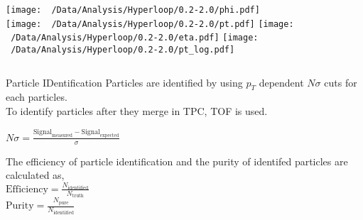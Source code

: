 \documentclass{beamer}
\begin{document}
\begin{frame}
	\begin{columns}
		\centering
		\texttt{[image: ~/Data/Analysis/Hyperloop/0.2-2.0/phi.pdf]}\\
		\texttt{[image: ~/Data/Analysis/Hyperloop/0.2-2.0/pt.pdf]}
		\centering
		\texttt{[image: ~/Data/Analysis/Hyperloop/0.2-2.0/eta.pdf]}
		\texttt{[image: ~/Data/Analysis/Hyperloop/0.2-2.0/pt\_log.pdf]}
	\end{columns}
\end{frame}
\begin{frame}{Particle IDentification}
	Particles are identified by using $p_T$ dependent $N\sigma$ cuts for each particles.\\
	To identify particles after they merge in TPC, TOF is used.\\
	\begin{definition}\centering
		$N\sigma=\frac{\mathrm{Signal}_\mathrm{measured}-\mathrm{Signal}_\mathrm{expected}}{\sigma}$\\
	\end{definition}
	The efficiency of particle identification and the purity of identifed particles are calculated as,\\
		\centering
		$\mathrm{Efficiency}=\frac{N_\mathrm{identified}}{N_\mathrm{truth}}$\\
		$\mathrm{Purity}=\frac{N_\mathrm{pure}}{N_\mathrm{identified}}$
\end{frame}
\end{document}
